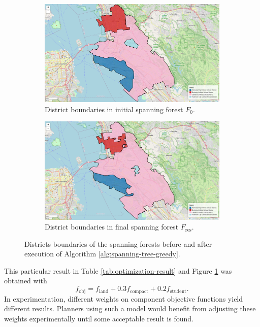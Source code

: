 \documentclass{article}
\begin{document}
\begin{figure}[H]
    \begin{subfigure}{\textwidth}
        \centering
        \includegraphics[width=\textwidth]{figure/result_before.png}
        \caption{District boundaries in initial spanning forest \(F_0\).}        
    \end{subfigure}
    \begin{subfigure}{\textwidth}
        \centering
        \includegraphics[width=\textwidth]{figure/result.png}
        \caption{District boundaries in final spanning forest \(F_{\text{res}}\).}        
    \end{subfigure}
    \caption{Districts boundaries of the spanning forests before and after execution of Algorithm \ref{alg:spanning-tree-greedy}.} 
    \label{fig:optimization-result}
\end{figure}

This particular result in Table \ref{tab:optimization-result} and Figure \ref{fig:optimization-result} was obtained with
\begin{equation}
    f_{\text{obj}} = f_{\text{land}} + 0.3f_{\text{compact}} + 0.2f_{\text{student}}.
\end{equation}
In experimentation, different weights on component objective functions yield different results. Planners using such a model would benefit from adjusting these weights experimentally until some acceptable result is found.
\end{document}
